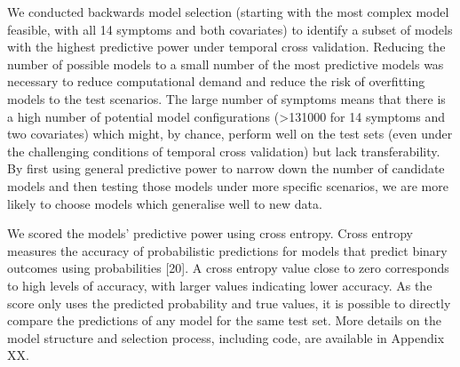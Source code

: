 \documentclass[]{elsarticle} %
\begin{document}
We conducted backwards model selection (starting with the most complex
model feasible, with all 14 symptoms and both covariates) to identify a
subset of models with the highest predictive power under temporal cross
validation. Reducing the number of possible models to a small number of
the most predictive models was necessary to reduce computational demand
and reduce the risk of overfitting models to the test scenarios. The
large number of symptoms means that there is a high number of potential
model configurations (\textgreater131000 for 14 symptoms and two
covariates) which might, by chance, perform well on the test sets (even
under the challenging conditions of temporal cross validation) but lack
transferability. By first using general predictive power to narrow down
the number of candidate models and then testing those models under more
specific scenarios, we are more likely to choose models which generalise
well to new data.

We scored the models' predictive power using cross entropy. Cross
entropy measures the accuracy of probabilistic predictions for models
that predict binary outcomes using probabilities {[}20{]}. A cross
entropy value close to zero corresponds to high levels of accuracy, with
larger values indicating lower accuracy. As the score only uses the
predicted probability and true values, it is possible to directly
compare the predictions of any model for the same test set. More details
on the model structure and selection process, including code, are
available in Appendix XX.
\end{document}
